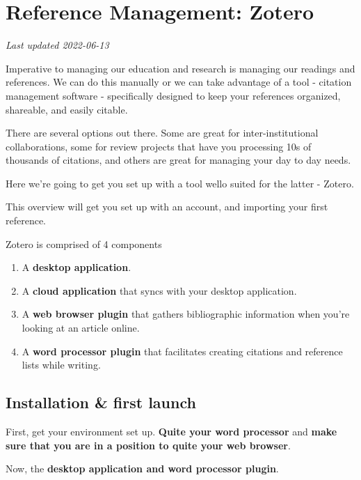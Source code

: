 \documentclass[
]{book}
\providecommand{\tightlist}{%
  \setlength{\itemsep}{0pt}\setlength{\parskip}{0pt}}
\begin{document}
\hypertarget{reference-management-zotero}{%
\chapter{Reference Management: Zotero}\label{reference-management-zotero}}

\emph{Last updated 2022-06-13}

Imperative to managing our education and research is managing our readings and references. We can do this manually or we can take advantage of a tool - citation management software - specifically designed to keep your references organized, shareable, and easily citable.

There are several options out there. Some are great for inter-institutional collaborations, some for review projects that have you processing 10s of thousands of citations, and others are great for managing your day to day needs.

Here we're going to get you set up with a tool wello suited for the latter - Zotero.

This overview will get you set up with an account, and importing your first reference.

Zotero is comprised of 4 components

\begin{enumerate}
\def\labelenumi{\arabic{enumi}.}
\tightlist
\item
  A \textbf{desktop application}.
\item
  A \textbf{cloud application} that syncs with your desktop application.
\item
  A \textbf{web browser plugin} that gathers bibliographic information when you're looking at an article online.
\item
  A \textbf{word processor plugin} that facilitates creating citations and reference lists while writing.
\end{enumerate}

\hypertarget{installation-first-launch}{%
\section{Installation \& first launch}\label{installation-first-launch}}

First, get your environment set up. \textbf{Quite your word processor} and \textbf{make sure that you are in a position to quite your web browser}.

Now, the \textbf{desktop application and word processor plugin}.
\end{document}
